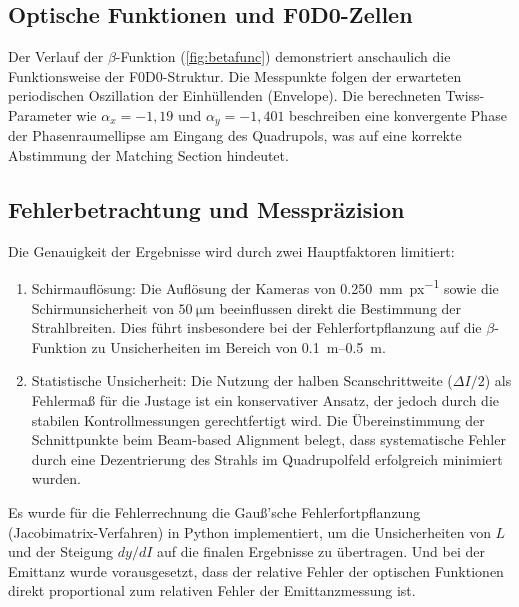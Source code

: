\documentclass[10pt,a4paper, bibliography=totoc]{scrartcl}
\begin{document}
\subsection{Optische Funktionen und F0D0-Zellen}
Der Verlauf der $\beta$-Funktion (\autoref{fig:betafunc}) demonstriert anschaulich die Funktionsweise der F0D0-Struktur. Die Messpunkte folgen der erwarteten periodischen Oszillation der Einhüllenden (Envelope). Die berechneten Twiss-Parameter wie $\alpha_x = -1,19$ und $\alpha_y = -1,401$ beschreiben eine konvergente Phase der Phasenraumellipse am Eingang des Quadrupols, was auf eine korrekte Abstimmung der Matching Section hindeutet.

\subsection{Fehlerbetrachtung und Messpräzision}
Die Genauigkeit der Ergebnisse wird durch zwei Hauptfaktoren limitiert:
\begin{enumerate}
    \item Schirmauflösung: Die Auflösung der Kameras von \qty{0,250}{\mm\per px} sowie die Schirmunsicherheit von $\qty{50}{\micro\m}$ beeinflussen direkt die Bestimmung der Strahlbreiten. Dies führt insbesondere bei der Fehlerfortpflanzung auf die $\beta$-Funktion zu Unsicherheiten im Bereich von \qtyrange{0,1}{0,5}{\m}.
    \item Statistische Unsicherheit: Die Nutzung der halben Scanschrittweite ($\Delta I/2$) als Fehlermaß für die Justage ist ein konservativer Ansatz, der jedoch durch die stabilen Kontrollmessungen gerechtfertigt wird. Die Übereinstimmung der Schnittpunkte beim Beam-based Alignment belegt, dass systematische Fehler durch eine Dezentrierung des Strahls im Quadrupolfeld erfolgreich minimiert wurden.
\end{enumerate}
Es wurde für die Fehlerrechnung die Gauß'sche Fehlerfortpflanzung (Jacobimatrix-Verfahren) in Python implementiert, um die Unsicherheiten von $L$ und der Steigung $dy/dI$ auf die finalen Ergebnisse zu übertragen. Und bei der Emittanz wurde vorausgesetzt, dass der relative Fehler der optischen Funktionen direkt proportional zum relativen Fehler der Emittanzmessung ist.
\end{document}
